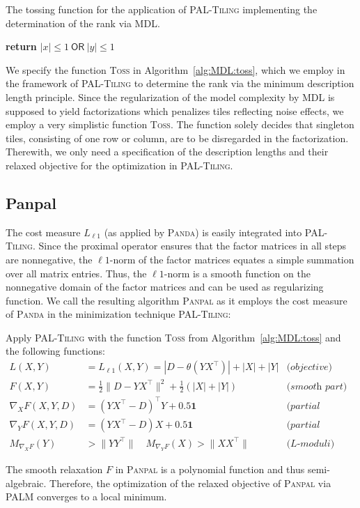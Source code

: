 \begin{algorithm}[t]
\caption{The tossing function for the application of \textsc{PAL-Tiling} implementing the determination of the rank via MDL.} 
\begin{algorithmic}[1]
  	\State \textbf{return} $|x|\leq 1\ \mathsf{OR}\ |y|\leq 1$ 
  \EndFunction
\end{algorithmic}
\label{alg:MDL:toss}
\end{algorithm}
We specify the function \textsc{Toss} in Algorithm~\ref{alg:MDL:toss}, which we employ in the framework of \textsc{PAL-Tiling} to determine the rank via the minimum description length principle. Since the regularization of the model complexity by MDL is supposed to yield factorizations which penalizes tiles reflecting noise effects, we employ a very simplistic function \textsc{Toss}. The function solely decides that singleton tiles, consisting of one row or column, are to be disregarded in the factorization. Therewith, we only need a specification of the description lengths and their relaxed objective for the optimization in \textsc{PAL-Tiling}.
\subsection{Panpal}\label{sec:MDL:panpal}
The cost measure $L_{\ell 1}$ (as applied by \textsc{Panda}) is easily  integrated into \textsc{PAL-Tiling}. Since the proximal operator ensures that the factor matrices in all steps are nonnegative, the $\ell 1$-norm of the factor matrices equates a simple summation over all matrix entries. Thus, the $\ell 1$-norm is a smooth function on the nonnegative domain of the factor matrices and can be used as regularizing function. We call the resulting algorithm \textsc{Panpal} as it employs the cost measure of \textsc{Panda} in the minimization technique \textsc{PAL-Tiling}:
\begin{mybox}
\begin{algSpec}[Panpal] \label{algSpec:panpal}
Apply \textsc{PAL-Tiling} with the function \textsc{Toss} from Algorithm~\ref{alg:MDL:toss} and the following functions:
\begin{align*}
    L(X,Y)&=L_{\ell 1}(X,Y) = |D-\theta(YX^\top )|+|X|+|Y| & \textit{(objective)}\\
    F(X,Y)&=\frac{1}{2}\|D-YX^\top \|^2+ \frac{1}{2}(|X|+|Y|) & \textit{(smooth part)}\\
    \nabla_XF(X,Y,D)&=(YX^\top -D)^\top Y+0.5\mathbf{1}& \textit{(partial gradient X)}\\
\nabla_YF(X,Y,D)&=(YX^\top -D)X+0.5\mathbf{1} & \textit{(partial gradient Y)}\\
M_{\nabla_XF}(Y)&>\|YY^\top \| \quad M_{\nabla_YF}(X)>\|XX^\top \| & \textit{(L-moduli)}
\end{align*}
\end{algSpec}
\end{mybox}
The smooth relaxation $F$ in \textsc{Panpal} is a polynomial function and thus semi-algebraic. Therefore, the optimization of the relaxed objective of \textsc{Panpal} via PALM converges to a local minimum.
